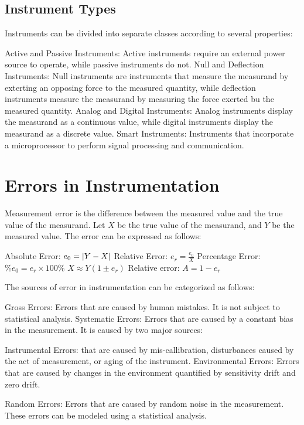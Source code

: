 \documentclass{report}
\begin{document}
\section{Instrument Types}

Instruments can be divided into separate classes according to several properties:

\begin{itemize}
	\ii Active and Passive Instruments: Active instruments require an external power source to operate, while passive instruments do not.
	\ii Null and Deflection Instruments: Null instruments are instruments that measure the measurand by exterting an opposing force to the measured quantity, while deflection instruments measure the measurand by measuring the force exerted bu the measured quantity.
	\ii Analog and Digital Instruments: Analog instruments display the measurand as a continuous value, while digital instruments display the measurand as a discrete value.
	\ii Smart Instruments: Instruments that incorporate a microprocessor to perform signal processing and communication.
\end{itemize}

\chapter{Errors in Instrumentation}

Measurement error is the difference between the measured value and the true value of the measurand. Let $X$ be the true value of the measurand, and $Y$ be the measured value. The error can be expressed as follows:

\begin{itemize}
	\ii Absolute Error: $e_0 = \abs{Y - X}$
	\ii Relative Error: $e_r = \frac{e_0}{X}$
	\ii Percentage Error: $\% e_0 = e_r \times 100\%$
	\ii $X \approx Y (1\pm e_r)$
	\ii Relative error: $A = 1-e_r$
\end{itemize}

The sources of error in instrumentation can be categorized as follows:

\begin{itemize}
	\ii Gross Errors: Errors that are caused by human mistakes. It is not subject to statistical analysis.
	\ii Systematic Errors: Errors that are caused by a constant bias in the measurement. It is caused by two major sources:
	\begin{itemize}
		\ii Instrumental Errors: that are caused by mis-callibration, disturbances caused by the act of measurement, or aging of the instrument.
		\ii Environmental Errors: Errors that are caused by changes in the environment quantified by sensitivity drift and zero drift.
	\end{itemize}
	\ii Random Errors: Errors that are caused by random noise in the measurement. These errors can be modeled using a statistical analysis.
\end{itemize}
\end{document}
